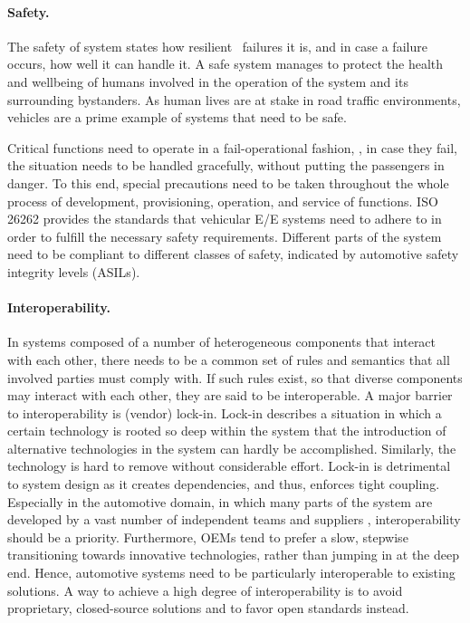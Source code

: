 \paragraph{Safety.}
The safety of system states how resilient \wrt\ failures it is, and in case a failure occurs, how well it can handle it. A safe system manages to protect the health and wellbeing of humans involved in the operation of the system and its surrounding bystanders.
As human lives are at stake in road traffic environments, vehicles are a prime example of systems that need to be safe.

Critical functions need to operate in a fail-operational fashion, \ie , in case they fail, the situation needs to be handled gracefully, without putting the passengers in danger. To this end, special precautions need to be taken throughout the whole process of development, provisioning, operation, and service of functions. ISO 26262 \cite{iso201126262} provides the standards that vehicular E/E systems need to adhere to in order to fulfill the necessary safety requirements. Different parts of the system need to be compliant to different classes of safety, indicated by automotive safety integrity levels (ASILs).

\paragraph{Interoperability.} 
In systems composed of a number of heterogeneous components that interact with each other, there needs to be a common set of rules and semantics that all involved parties must comply with. If such rules exist, so that diverse components may interact with each other, they are said to be interoperable.
A major barrier to interoperability is (vendor) lock-in. Lock-in describes a situation in which a certain technology is rooted so deep within the system that the introduction of alternative technologies in the system can hardly be accomplished. Similarly, the technology is hard to remove without considerable effort. Lock-in is detrimental to system design as it creates dependencies, and thus, enforces tight coupling. Especially in the automotive domain, in which many parts of the system are developed by a vast number of independent teams and suppliers \cite{broy2006challenges}, interoperability should be a priority. Furthermore, OEMs tend to prefer a slow, stepwise transitioning towards innovative technologies, rather than jumping in at the deep end. Hence, automotive systems need to be particularly interoperable to existing solutions. A way to achieve a high degree of interoperability is to avoid proprietary, closed-source solutions and to favor open standards instead.

